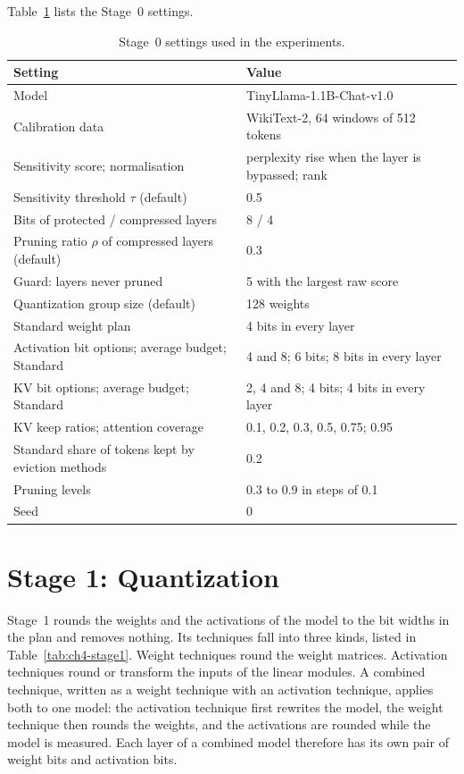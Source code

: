 Table~\ref{tab:ch4-stage0-settings} lists the Stage~0 settings.

\begin{table}[htbp]
\centering
\small
\caption{Stage~0 settings used in the experiments.}
\label{tab:ch4-stage0-settings}
\renewcommand{\arraystretch}{1.15}
\begin{tabularx}{\textwidth}{Xl}
\hline
\textbf{Setting} & \textbf{Value} \\
\hline
Model & TinyLlama-1.1B-Chat-v1.0 \cite{zhang2024tinyllama} \\
Calibration data & WikiText-2, 64 windows of 512 tokens \\
Sensitivity score; normalisation & perplexity rise when the layer is bypassed; rank \\
Sensitivity threshold $\tau$ (default) & 0.5 \\
Bits of protected / compressed layers & 8 / 4 \\
Pruning ratio $\rho$ of compressed layers (default) & 0.3 \\
Guard: layers never pruned & 5 with the largest raw score \\
Quantization group size (default) & 128 weights \\
Standard weight plan & 4 bits in every layer \\
Activation bit options; average budget; Standard & 4 and 8; 6 bits; 8 bits in every layer \\
KV bit options; average budget; Standard & 2, 4 and 8; 4 bits; 4 bits in every layer \\
KV keep ratios; attention coverage & 0.1, 0.2, 0.3, 0.5, 0.75; 0.95 \\
Standard share of tokens kept by eviction methods & 0.2 \\
Pruning levels & 0.3 to 0.9 in steps of 0.1 \\
Seed & 0 \\
\hline
\end{tabularx}
\end{table}

\section{Stage 1: Quantization}
\label{sec:ch4-stage1}

Stage~1 rounds the weights and the activations of the model to the bit widths in the plan and removes nothing. Its techniques fall into three kinds, listed in Table~\ref{tab:ch4-stage1}. Weight techniques round the weight matrices. Activation techniques round or transform the inputs of the linear modules. A combined technique, written as a weight technique with an activation technique, applies both to one model: the activation technique first rewrites the model, the weight technique then rounds the weights, and the activations are rounded while the model is measured. Each layer of a combined model therefore has its own pair of weight bits and activation bits.

